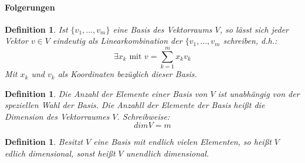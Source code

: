 \documentclass[12pt,a4paper]{report}%
\newtheorem{definition}[satz]{Definition}
\numberwithin{equation}{section}
\newcommand{\subsubsubsection}{\paragraph}
\def\mDef#1{
\begin{definition}
  #1
\end{definition}}
\numberwithin{equation}{subsection}
\begin{document}
     \subsubsubsection{Folgerungen}
     \begin{definition}
		  \glqq Ist $\lbrace v_1,...,v_m \rbrace$ eine Basis des Vektorraums $V$, so lässt sich jeder Vektor $v \in V$ eindeutig als Linearkombination der $\lbrace               
		    v_1,...,v_m$ schreiben, d.h.:
		    \begin{equation}
		      \exists x_k \text{ mit } v = \sum_{k=1}^m x_k v_k
		    \end{equation}
		    \grqq \cite{HM12}\newline
		    Mit $x_k$ und $v_k$ als Koordinaten bezüglich dieser Basis.
	    \end{definition}
	    
	    \begin{definition}
		    \glqq Die Anzahl der Elemente einer Basis von $V$ ist unabhängig von der speziellen Wahl der Basis. Die Anzahll der Elemente der Basis heißt die Dimension des Vektorraumes $V$.\grqq \cite{HM12} Schreibweise:
		    \begin{equation}
		      dim V = m
		    \end{equation}
		   \end{definition}
		   
		   \mDef{
		     \glqq Besitzt $V$ eine Basis mit endlich vielen Elementen, so heißt $V$ edlich dimensional, sonst heißt $V$ unendlich dimensional. \grqq \cite{HM12}
		   }
		   
\end{document}
